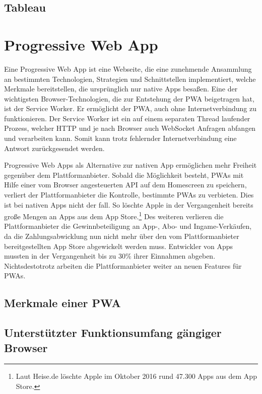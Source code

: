 \subsection{Tableau}

\section{Progressive Web App}
Eine Progressive Web App ist eine Webseite, die eine zunehmende Ansammlung an bestimmten Technologien,
Strategien und Schnittstellen implementiert, welche Merkmale bereitstellen, die ursprünglich nur
native Apps besaßen.\cite{WikiPWA} Eine der wichtigsten Browser-Technologien, die zur Entstehung der PWA beigetragen hat,
ist der Service Worker. Er ermöglicht der PWA, auch ohne Internetverbindung zu funktionieren. Der 
Service Worker ist ein auf einem separaten Thread laufender Prozess, welcher HTTP und je nach Browser
auch WebSocket Anfragen abfangen und verarbeiten kann. Somit kann trotz fehlernder Internetverbindung
eine Antwort zurückgesendet werden. \cite{W3ServiceWorker}

Progressive Web Apps als Alternative zur nativen App ermöglichen mehr Freiheit gegenüber dem
Plattformanbieter. Sobald die Möglichkeit besteht, PWAs mit Hilfe einer vom Browser angesteuerten API
auf dem Homescreen zu speichern, verliert der Plattformanbieter die Kontrolle,
bestimmte PWAs zu verbieten. Dies ist bei nativen Apps nicht der fall. So löschte Apple in der Vergangenheit
bereits große Mengen an Apps aus dem App Store.\footnote[1]{Laut Heise.de löschte Apple im Oktober 2016 rund 47.300 Apps aus dem App Store.\cite{HeiseAppleLoeschtApps}} 
Des weiteren verlieren die Plattformanbieter die Gewinnbeteiligung an App-, Abo- und Ingame-Verkäufen,
da die Zahlungsabwicklung nun nicht mehr über den vom Plattformanbieter bereitgestellten App Store
abgewickelt werden muss. Entwickler von Apps mussten in der Vergangenheit bis zu 30\% 
ihrer Einnahmen abgeben. \cite{WinFutureEigenerAppStore} Nichtsdestotrotz arbeiten
die Plattformanbieter weiter an neuen Features für PWAs.


\subsection{Merkmale einer PWA}

\subsection{Unterstützter Funktionsumfang gängiger Browser}

